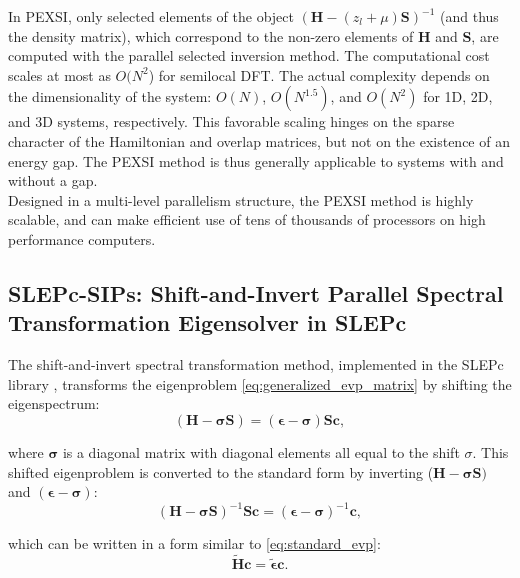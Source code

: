 \documentclass{report}
\begin{document}
In PEXSI, only selected elements of the object $(\boldsymbol{H} - (z_l + \mu) \boldsymbol{S})^{-1}$ (and thus the density matrix), which correspond to the non-zero elements of $\boldsymbol{H}$ and $\boldsymbol{S}$, are computed with the parallel selected inversion method.  The computational cost scales at most as $O(N^2$) for semilocal DFT.  The actual complexity depends on the dimensionality of the system:  $O(N)$, $O(N^{1.5})$, and $O(N^2)$ for 1D, 2D, and 3D systems, respectively.  This favorable scaling hinges on the sparse character of the Hamiltonian and overlap matrices, but not on the existence of an energy gap.  The PEXSI method is thus generally applicable to systems with and without a gap.\\

Designed in a multi-level parallelism structure, the PEXSI method is highly scalable, and can make efficient use of tens of thousands of processors on high performance computers.\\

\subsection{SLEPc-SIPs:  Shift-and-Invert Parallel Spectral Transformation Eigensolver in SLEPc}
\label{subsec:solvers_sips}
The shift-and-invert spectral transformation method, implemented in the SLEPc library \cite{slepc_hernandez_2005}, transforms the eigenproblem \ref{eq:generalized_evp_matrix} by shifting the eigenspectrum:\\
\begin{equation}
\label{eq:shift}
(\boldsymbol{H} - \boldsymbol{\sigma} \boldsymbol{S}) = (\boldsymbol{\epsilon} - \boldsymbol{\sigma}) \boldsymbol{S} \boldsymbol{c} ,
\end{equation}

\noindent where $\boldsymbol{\sigma}$ is a diagonal matrix with diagonal elements all equal to the shift $\sigma$.  This shifted eigenproblem is converted to the standard form by inverting ($\boldsymbol{H} - \boldsymbol{\sigma S})$ and $(\boldsymbol{\epsilon - \sigma})$:\\
\begin{equation}
\label{eq:invert}
(\boldsymbol{H} - \boldsymbol{\sigma S})^{-1} \boldsymbol{S} \boldsymbol{c} = (\boldsymbol{\epsilon - \sigma})^{-1} \boldsymbol{c} ,
\end{equation}

\noindent which can be written in a form similar to \ref{eq:standard_evp}:\\
\begin{equation}
\label{eq:standard_evp2}
\boldsymbol{\tilde{H}} \boldsymbol{c} = \boldsymbol{\tilde{\epsilon}} \boldsymbol{c} .
\end{equation}
\end{document}
